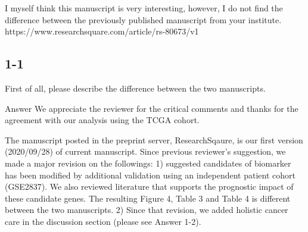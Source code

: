 \documentclass[preprint,12pt]{elsarticle}
\newenvironment{MyColorPar}[1]{%
    \leavevmode\color{#1}\ignorespaces%
}{%
}%
\begin{document}
I myself think this manuscript is very interesting, however, I do not find the difference between the previously published manuscript from your institute.
https://www.researchsquare.com/article/rs-80673/v1

\subsection*{1-1}
First of all, please describe the difference between the two manuscripts.




\begin{MyColorPar}{blue}
Answer
We appreciate the reviewer for the critical comments and thanks for the agreement with our analysis using the TCGA cohort.

The manuscript posted in the preprint server, ResearchSqaure, is our first version (2020/09/28) of current manuscript. 
Since previous reviewer's suggestion, we made a major revision on the followings:
1) suggested  candidates of biomarker has been modified  by additional validation using an independent patient cohort (GSE2837).
We also reviewed literature that supports the prognostic impact of these candidate genes. The resulting Figure 4, Table 3 and Table 4 is different between the two manuscripts.
2) Since that revision, we added holistic cancer care in the discussion section (please see Answer 1-2).%





\end{MyColorPar}
\end{document}

